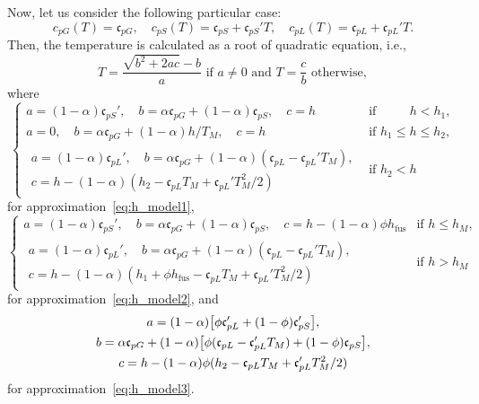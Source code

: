 \documentclass[final]{elsarticle} %
\newcommand{\fusion}[1]{{#1}_\text{fus}}
\newcommand{\Cp}[1]{\mathfrak{c}_{p#1}}
\begin{document}
Now, let us consider the following particular case:
\begin{equation}\label{eq:c_p_special2}
    c_{pG}(T) = \Cp{G}, \quad c_{pS}(T) = \Cp{S} + \Cp{S}'T, \quad c_{pL}(T) = \Cp{L} + \Cp{L}'T.
\end{equation}
Then, the temperature is calculated as a root of quadratic equation, i.e.,
\begin{equation}\label{eq:T_special2}
    T = \frac{\sqrt{b^2 + 2ac} - b}{a} \text{ if } a\neq0 \text{ and }
    T = \frac{c}{b} \text{ otherwise},
\end{equation}
where
\begin{equation}\label{eq:abc1}
    \begin{cases}
        a=(1-\alpha)\Cp{S}', \quad b =\alpha\Cp{G} + (1-\alpha)\Cp{S}, \quad c=h
            &\text{if }\qquad\,\, h < h_1, \\
        a=0, \quad b=\alpha\Cp{G} + (1-\alpha)h/T_M, \quad c=h
            &\text{if } h_1 \leq h \leq h_2, \\
        \begin{gathered}
        a=(1-\alpha)\Cp{L}', \quad b=\alpha\Cp{G} + (1-\alpha)(\Cp{L}-\Cp{L}'T_M), \\
            c = h - (1-\alpha)(h_2 - \Cp{L}T_M + \Cp{L}'T_M^2/2)
        \end{gathered} &\text{if } h_2 < h
    \end{cases}
\end{equation}
for approximation~\eqref{eq:h_model1},
\begin{equation}\label{eq:abc2}
    \begin{cases}
        a=(1-\alpha)\Cp{S}', \quad b =\alpha\Cp{G} + (1-\alpha)\Cp{S}, \quad
            c=h - (1-\alpha)\phi\fusion{h} &\text{if } h \leq h_M, \\
        \begin{gathered}
        a=(1-\alpha)\Cp{L}', \quad b=\alpha\Cp{G} + (1-\alpha)(\Cp{L}-\Cp{L}'T_M), \\
            c = h - (1-\alpha)(h_1 + \phi\fusion{h} - \Cp{L}T_M + \Cp{L}'T_M^2/2)
        \end{gathered} &\text{if } h > h_M
    \end{cases}
\end{equation}
for approximation~\eqref{eq:h_model2}, and
\begin{equation}\label{eq:abc3}
    \begin{gathered}
    a = (1-\alpha)\qty[ \phi\Cp{L}' + (1-\phi)\Cp{S}' ], \\
    b = \alpha\Cp{G} + (1-\alpha)\qty[ \phi(\Cp{L}-\Cp{L}'T_M) + (1-\phi)\Cp{S} ], \\
    c = h - (1-\alpha)\phi(h_2 - \Cp{L}T_M + \Cp{L}'T_M^2/2)
    \end{gathered}
\end{equation}
for approximation~\eqref{eq:h_model3}.
\end{document}
